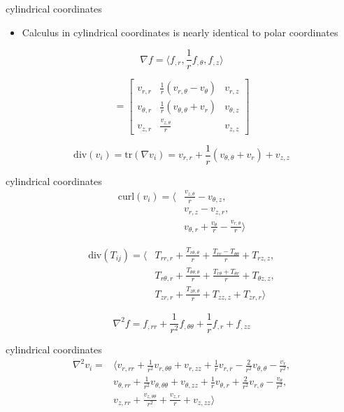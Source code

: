 \begin{frame}{cylindrical coordinates}
\protect\hypertarget{cylindrical-coordinates-1}{}
\begin{itemize}
\tightlist
\item
  Calculus in cylindrical coordinates is nearly identical to polar
  coordinates
\end{itemize}

\[\nabla f = \langle f_{,r}, \frac{1}{r}f_{,\theta}, f_{,z} \rangle\]

\[= \begin{bmatrix}
    v_{r,r} & \frac{1}{r}(v_{r,\theta}-v_\theta) & v_{r,z}\\
    v_{\theta,r} & \frac{1}{r}(v_{\theta,\theta}+v_r) & v_{\theta,z}\\
    v_{z,r} & \frac{v_{z,\theta}}{r} & v_{z,z}
\end{bmatrix}\]

\[\text{div} (v_i) = \text{tr} (\nabla v_i) = v_{r,r} +\frac{1}{r}(v_{\theta,\theta}+v_r) + v_{z,z}\]
\end{frame}

\begin{frame}{cylindrical coordinates}
\protect\hypertarget{cylindrical-coordinates-2}{}
\[\begin{aligned}
    \text{curl} (v_i) = \langle &\frac{v_{z,\theta}}{r} - v_{\theta,z},\\
    & v_{r,z} - v_{z,r},\\
    & v_{\theta,r} + \frac{v_\theta}{r} - \frac{v_{r,\theta}}{r} \rangle
\end{aligned}\]

\[\begin{aligned}
    \text{div} (T_{ij}) = \langle &T_{rr,r} + \frac{T_{r\theta,\theta}}{r} + \frac{T_{rr}-T_{\theta\theta}}{r} + T_{rz,z},\\
    &T_{r\theta,r} + \frac{T_{\theta\theta,\theta}}{r}  + \frac{T_{r\theta} + T_{\theta r}}{r} + T_{\theta z, z},\\
    &T_{zr,r} + \frac{T_{z\theta,\theta}}{r} + T_{zz,z} + T_{zr,r}\rangle
\end{aligned}\]

\[\nabla^2 f = f_{,rr} + \frac{1}{r^2} f_{,\theta\theta} + \frac{1}{r}f_{,r} + f_{,zz}\]
\end{frame}

\begin{frame}{cylindrical coordinates}
\protect\hypertarget{cylindrical-coordinates-3}{}
\[\begin{aligned}
    \nabla^2 v_i =& \langle v_{r,rr} + \frac{1}{r^2}v_{r,\theta\theta} + v_{r,zz} + \frac{1}{r}v_{r,r} - \frac{2}{r^2}v_{\theta,\theta}-\frac{v_r}{r^2},\\
    & v_{\theta,rr} + \frac{1}{r^2}v_{\theta,\theta\theta} + v_{\theta,zz} + \frac{1}{r}v_{\theta,r} + \frac{2}{r^2}v_{r,\theta}- \frac{v_\theta}{r^2},\\
    & v_{z,rr} + \frac{v_{z,\theta\theta}}{r^2} + \frac{v_{z,r}}{r} + v_{z,zz}\rangle
\end{aligned}\]
\end{frame}

